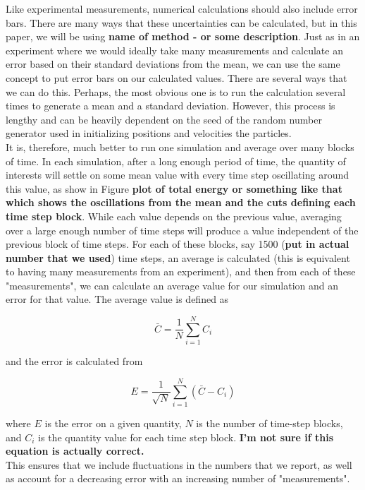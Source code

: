 \documentclass{article}
\begin{document}
\begin{multicols}{2}
Like experimental measurements, numerical calculations should also include error bars.  There are many ways that these uncertainties can be calculated, but in this paper, we will be using \textbf{name of method - or some description}.  Just as in an experiment where we would ideally take many measurements and calculate an error based on their standard deviations from the mean, we can use the same concept to put error bars on our calculated values.  There are several ways that we can do this.  Perhaps, the most obvious one is to run the calculation several times to generate a mean and a standard deviation.  However, this process is lengthy and can be heavily dependent on the seed of the random number generator used in initializing positions and velocities the particles.  \\

It is, therefore, much better to run one simulation and average over many blocks of time.  In each simulation, after a long enough period of time, the quantity of interests will settle on some mean value with every time step oscillating around this value, as show in Figure \textbf{plot of total energy or something like that which shows the oscillations from the mean and the cuts defining each time step block}.  While each value depends on the previous value, averaging over a large enough number of time steps will produce a value independent of the previous block of time steps.  For each of these blocks, say 1500 (\textbf{put in actual number that we used}) time steps, an average is calculated (this is equivalent to having many measurements from an experiment), and then from each of these "measurements", we can calculate an average value for our simulation and an error for that value.  The average value is defined as 

\begin{equation}
\bar{C} = \frac{1}{N}\sum \limits _{i=1}^N C_i 
\end{equation}

\noindent and the error is calculated from 

\begin{equation}
E = \frac{1}{\sqrt{N}}\sum \limits _{i=1}^N (\bar{C} - C_{i})
\end{equation}

\noindent where $E$ is the error on a given quantity, $N$ is the number of time-step blocks, and $C_i$ is the quantity value for each time step block.  \textbf{I'm not sure if this equation is actually correct.}\\

This ensures that we include fluctuations in the numbers that we report, as well as account for a decreasing error with an increasing number of "measurements".  



\end{multicols}
\end{document}
